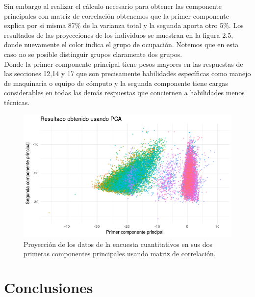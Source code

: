 \documentclass[paper=letter, fontsize=11pt]{scrartcl}
\numberwithin{equation}{section} %
\numberwithin{figure}{section} %
\numberwithin{table}{section} %
\begin{document}
Sin embargo al realizar el cálculo necesario para obtener las componente principales con matriz de correlación obtenemos que la primer componente explica por si misma 87\% de la varianza total y la segunda aporta otro 5\%. Los resultados de las proyecciones de los individuos se muestran en la figura 2.5, donde nuevamente el color indica el grupo de ocupación. Notemos que en esta caso no se posible distinguir grupos claramente dos grupos.\\

Donde la primer componente principal tiene pesos mayores en las respuestas de las secciones 12,14 y 17 que son precisamente habilidades específicas como manejo de maquinaria o equipo de cómputo y la segunda componente tiene cargas considerables en todas las demás respuestas que conciernen a habilidades menos técnicas.

\begin{figure}[H]
  \begin{center}
    \includegraphics[scale=0.8]{resultado_pca.png}
    \caption{Proyección de los datos de la encuesta cuantitativos en sus dos primeras componentes principales usando matriz de correlación.   }
    \label{figura2_5}
  \end{center}
\end{figure}

\newpage
\section{Conclusiones}
\end{document}
